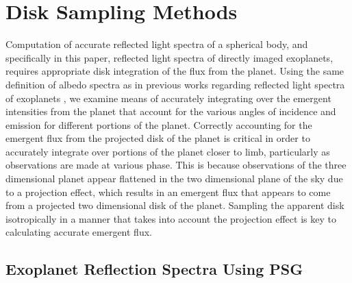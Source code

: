 \documentclass[12pt, letterpaper]{aastex631}
\begin{document}
  

\section{Disk Sampling Methods} \label{sec:sampling}

Computation of accurate reflected light spectra of a spherical body, and specifically in this paper, reflected light spectra of directly imaged exoplanets, requires appropriate disk integration of the flux from the planet.  Using the same definition of albedo spectra as in previous works regarding reflected light spectra of exoplanets \citep{2010ApJ...724..189C}, we examine means of accurately integrating over
the emergent intensities from the planet that account for the various angles of incidence and emission for different portions of the planet. Correctly accounting for the emergent flux from the projected disk of the planet is critical in order to accurately integrate over portions of the planet closer to limb, particularly as observations are made at various phase.  This is because observations of the three dimensional planet appear flattened in the two dimensional plane of the sky due to a projection effect, which results in an emergent flux that appears to come from a projected two dimensional disk of the planet.  Sampling the apparent disk isotropically in a manner that takes into account the projection effect is key to calculating accurate emergent flux. 

\subsection{Exoplanet Reflection Spectra Using PSG} \label{sec:ExoPSG}
\end{document}
